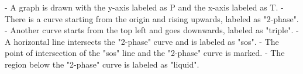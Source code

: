 - A graph is drawn with the y-axis labeled as P and the x-axis labeled as T.
- There is a curve starting from the origin and rising upwards, labeled as "2-phase".
- Another curve starts from the top left and goes downwards, labeled as "triple".
- A horizontal line intersects the "2-phase" curve and is labeled as "sos".
- The point of intersection of the "sos" line and the "2-phase" curve is marked.
- The region below the "2-phase" curve is labeled as "liquid".